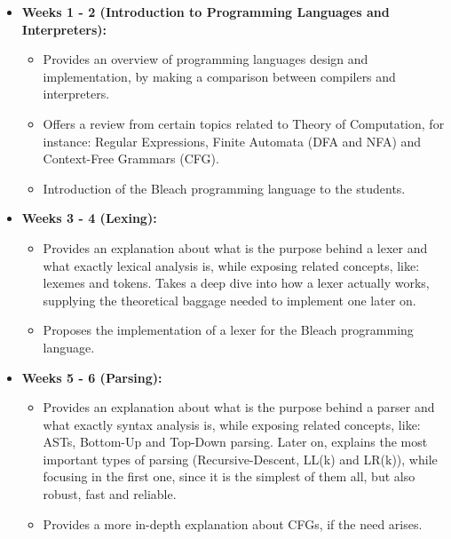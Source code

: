 \begin{itemize}
    \item \textbf{Weeks 1 - 2 (Introduction to Programming Languages and Interpreters):}
        \begin{itemize}
            \item Provides an overview of programming languages design and implementation, by making a comparison between compilers and interpreters.
            \item Offers a review from certain topics related to Theory of Computation, for instance: Regular Expressions, Finite Automata (DFA and NFA) and Context-Free Grammars (CFG).
            \item Introduction of the Bleach programming language to the students.
        \end{itemize}
    
    \item \textbf{Weeks 3 - 4 (Lexing):}
        \begin{itemize}
            \item Provides an explanation about what is the purpose behind a lexer and what exactly lexical analysis is, while exposing related concepts, like: lexemes and tokens. Takes a deep dive into how a lexer actually works, supplying the theoretical baggage needed to implement one later on.
            \item Proposes the implementation of a lexer for the Bleach programming language. 
        \end{itemize}

    
    \item \textbf{Weeks 5 - 6 (Parsing):} 
        \begin{itemize}
            \item Provides an explanation about what is the purpose behind a parser and what exactly syntax analysis is, while exposing related concepts, like: ASTs, Bottom-Up and Top-Down parsing. Later on, explains the most important types of parsing (Recursive-Descent, LL(k) and LR(k)), while focusing in the first one, since it is the simplest of them all, but also robust, fast and reliable.
            \item Provides a more in-depth explanation about CFGs, if the need arises.
        \end{itemize}
    

\end{itemize}
